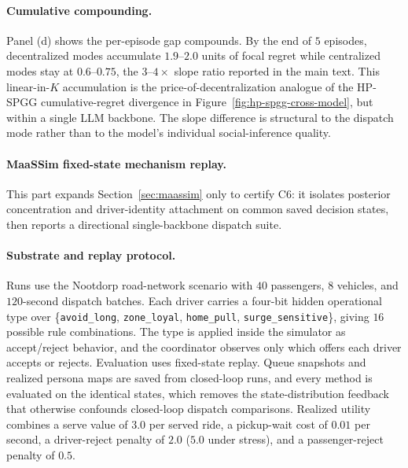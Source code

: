 \paragraph{Cumulative compounding.} Panel (d) shows the per-episode gap compounds. By the end of $5$ episodes, decentralized modes accumulate $1.9$--$2.0$ units of focal regret while centralized modes stay at $0.6$--$0.75$, the $3$--$4\times$ slope ratio reported in the main text. This linear-in-$K$ accumulation is the price-of-decentralization analogue of the HP-SPGG cumulative-regret divergence in Figure~\ref{fig:hp-spgg-cross-model}, but within a single LLM backbone. The slope difference is structural to the dispatch mode rather than to the model's individual social-inference quality.

\paragraph{MaaSSim fixed-state mechanism replay.}
\label{app:maassim}

This part expands Section~\ref{sec:maassim} only to certify C6: it isolates posterior concentration and driver-identity attachment on common saved decision states, then reports a directional single-backbone dispatch suite.

\paragraph{Substrate and replay protocol.}
Runs use the Nootdorp road-network scenario with $40$ passengers, $8$ vehicles, and $120$-second dispatch batches. Each driver carries a four-bit hidden operational type over \{\texttt{avoid\_long}, \texttt{zone\_loyal}, \texttt{home\_pull}, \texttt{surge\_sensitive}\}, giving $16$ possible rule combinations. The type is applied inside the simulator as accept/reject behavior, and the coordinator observes only which offers each driver accepts or rejects. Evaluation uses fixed-state replay. Queue snapshots and realized persona maps are saved from closed-loop runs, and every method is evaluated on the identical states, which removes the state-distribution feedback that otherwise confounds closed-loop dispatch comparisons. Realized utility combines a serve value of $3.0$ per served ride, a pickup-wait cost of $0.01$ per second, a driver-reject penalty of $2.0$ ($5.0$ under stress), and a passenger-reject penalty of $0.5$.

